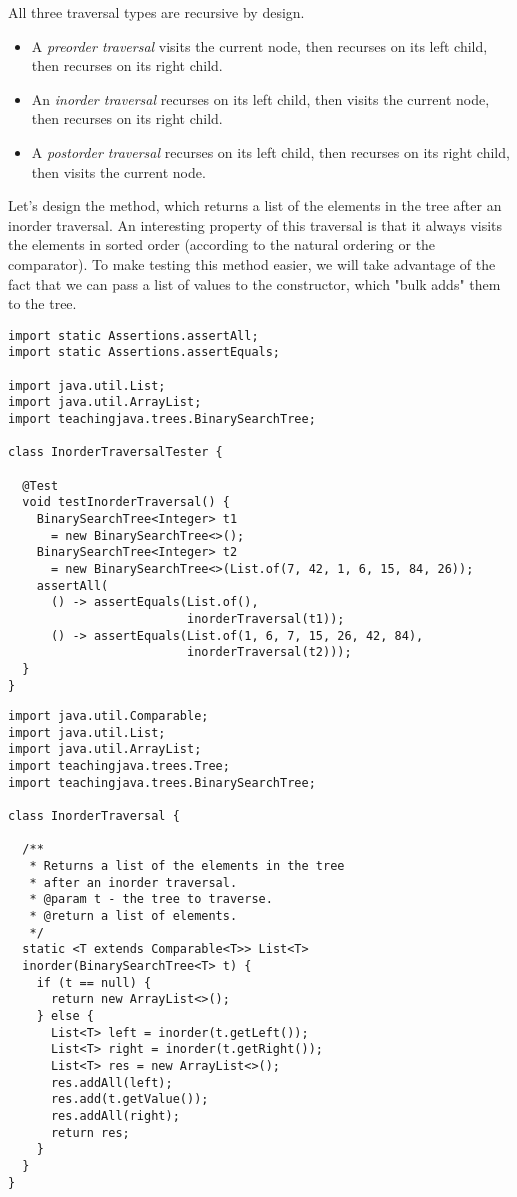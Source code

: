 All three traversal types are recursive by design.
\begin{itemize}
  \item A \emph{preorder traversal} visits the current node, then recurses on its left child, then recurses on its right child.
  \item An \emph{inorder traversal} recurses on its left child, then visits the current node, then recurses on its right child.
  \item A \emph{postorder traversal} recurses on its left child, then recurses on its right child, then visits the current node.
\end{itemize}

Let's design the  method, which returns a list of the elements in the tree after an inorder traversal. 
An interesting property of this traversal is that it always visits the elements in sorted order (according to the natural ordering or the comparator). 
To make testing this method easier, we will take advantage of the fact that we can pass a list of values to the  constructor, which "bulk adds" them to the tree.

\begin{lstlisting}[language=MyJava]
import static Assertions.assertAll;
import static Assertions.assertEquals;

import java.util.List;
import java.util.ArrayList;
import teachingjava.trees.BinarySearchTree;

class InorderTraversalTester {

  @Test
  void testInorderTraversal() {
    BinarySearchTree<Integer> t1 
      = new BinarySearchTree<>();
    BinarySearchTree<Integer> t2 
      = new BinarySearchTree<>(List.of(7, 42, 1, 6, 15, 84, 26));
    assertAll(
      () -> assertEquals(List.of(), 
                         inorderTraversal(t1));
      () -> assertEquals(List.of(1, 6, 7, 15, 26, 42, 84), 
                         inorderTraversal(t2)));
  }
}

\end{lstlisting}

\begin{lstlisting}[language=MyJava]
import java.util.Comparable;
import java.util.List;
import java.util.ArrayList;
import teachingjava.trees.Tree;
import teachingjava.trees.BinarySearchTree;

class InorderTraversal {

  /**
   * Returns a list of the elements in the tree 
   * after an inorder traversal.
   * @param t - the tree to traverse.
   * @return a list of elements.
   */
  static <T extends Comparable<T>> List<T> 
  inorder(BinarySearchTree<T> t) {
    if (t == null) {
      return new ArrayList<>();
    } else {
      List<T> left = inorder(t.getLeft());
      List<T> right = inorder(t.getRight());
      List<T> res = new ArrayList<>();
      res.addAll(left);
      res.add(t.getValue());
      res.addAll(right);
      return res;
    }
  }
}
\end{lstlisting}

